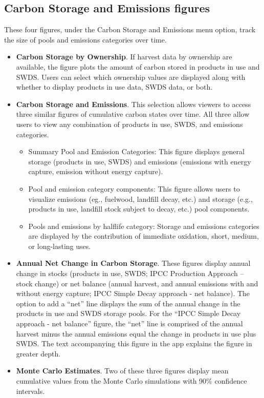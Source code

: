 \documentclass[
  openany]{book}
\providecommand{\tightlist}{%
  \setlength{\itemsep}{0pt}\setlength{\parskip}{0pt}}
\begin{document}
\hypertarget{app-shiny-cse}{%
\subsection{Carbon Storage and Emissions figures}\label{app-shiny-cse}}

These four figures, under the Carbon Storage and Emissions menu option,
track the size of pools and emissions categories over time.

\begin{itemize}
\item
  \textbf{Carbon Storage by Ownership}. If harvest data by ownership are
  available, the figure plots the amount of carbon stored in products in
  use and SWDS. Users can select which ownership values are displayed
  along with whether to display products in use data, SWDS data, or
  both.\\
\item
  \textbf{Carbon Storage and Emissions}. This selection allows viewers
  to access three similar figures of cumulative carbon states over time.
  All three allow users to view any combination of products in use,
  SWDS, and emissions categories.

  \begin{itemize}
  \tightlist
  \item
    Summary Pool and Emission Categories: This figure displays general
    storage (products in use, SWDS) and emissions (emissions with energy
    capture, emission without energy capture).
  \item
    Pool and emission category components: This figure allows users to
    visualize emissions (eg., fuelwood, landfill decay, etc.) and
    storage (e.g., products in use, landfill stock subject to decay,
    etc.) pool components.
  \item
    Pools and emissions by halflife category: Storage and emissions
    categories are displayed by the contribution of immediate oxidation,
    short, medium, or long-lasting uses.\\
  \end{itemize}
\item
  \textbf{Annual Net Change in Carbon Storage}. These figures display
  annual change in stocks (products in use, SWDS; IPCC Production
  Approach -- stock change) or net balance (annual harvest, and annual
  emissions with and without energy capture; IPCC Simple Decay approach
  - net balance). The option to add a ``net'' line displays the sum of
  the annual change in the products in use and SWDS storage pools. For
  the ``IPCC Simple Decay approach - net balance'' figure, the ``net''
  line is comprised of the annual harvest minus the annual emissions
  equal the change in products in use plus SWDS. The text accompanying
  this figure in the app explains the figure in greater depth.
\item
  \textbf{Monte Carlo Estimates}. Two of these three figures display
  mean cumulative values from the Monte Carlo simulations with 90\%
  confidence intervals.


\end{itemize}
\end{document}
